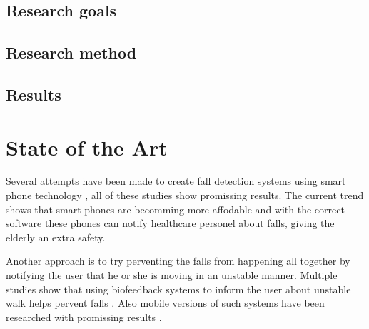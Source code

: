 \documentclass[11pt,twoside,a4paper]{report}
\begin{document}
\section{Research goals}

\section{Research method}

\section{Results}


\chapter{State of the Art}

Several attempts have been made to create fall detection systems using smart phone technology \cite{fall detection articles}, all of these studies show promissing results. The current trend shows that smart phones are becomming more affodable \cite{find some data about sales and decreasing prices} and with the correct software these phones can notify healthcare personel about falls, giving the elderly an extra safety.

Another approach is to try perventing the falls from happening all together by notifying the user that he or she is moving in an unstable manner. Multiple studies show that using biofeedback systems to inform the user about unstable walk helps pervent falls \cite{the articles that svanæs gave us}. Also mobile versions of such systems have been researched with promissing results \cite{article about mobile pervension of falls}.
\end{document}
